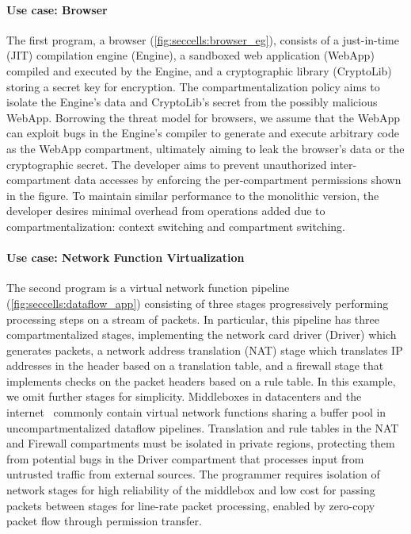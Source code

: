 \paragraph{Use case: Browser}
The first program, a browser (\autoref{fig:seccells:browser_eg}), consists of
a just-in-time (JIT) compilation engine (Engine), 
a sandboxed web application (WebApp) compiled and executed by the Engine, and 
a cryptographic library (CryptoLib) storing a secret key for encryption.
The compartmentalization policy aims to isolate the Engine's data
and CryptoLib's secret from the possibly malicious WebApp.
Borrowing the threat model for browsers, we assume that the 
WebApp can exploit bugs in the Engine's compiler to 
generate and execute arbitrary code as the WebApp compartment,
ultimately aiming to leak the browser's data or the cryptographic secret.
The developer aims to prevent unauthorized inter-compartment data accesses
by enforcing the per-compartment permissions shown in the figure.
To maintain similar performance to the monolithic version, the developer
desires minimal overhead from operations added due to compartmentalization:
context switching and compartment switching.

\paragraph{Use case: Network Function Virtualization}
The second program is a virtual network function pipeline 
(\autoref{fig:seccells:dataflow_app}) consisting of three stages progressively
performing processing steps on a stream of packets.
In particular, this pipeline has three compartmentalized stages, 
implementing the network card driver (Driver) which
generates packets, 
a network address translation (NAT) stage which translates IP 
addresses in the header based on a translation table, and
a firewall stage that implements checks on the packet headers
based on a rule table.
In this example, we omit further stages for simplicity.
Middleboxes in datacenters and the internet~\cite{MartinsAROHBH14}
commonly contain virtual network functions sharing a buffer pool
in uncompartmentalized dataflow pipelines.
Translation and rule tables in the NAT and Firewall compartments
must be isolated in private regions, protecting them from potential bugs 
in the Driver compartment that processes input from untrusted traffic 
from external sources.
The programmer requires isolation of network stages for high reliability
of the middlebox and low cost for passing packets between stages for 
line-rate packet processing, enabled by zero-copy packet flow 
through permission transfer.


